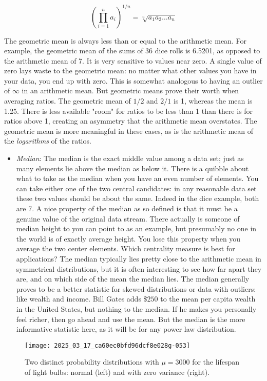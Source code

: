 \documentclass[10pt]{article}
\begin{document}
\[
\left(\prod_{i=1}^{n} a_{i}\right)^{1 / n}=\sqrt[n]{a_{1} a_{2} \ldots a_{n}}
\]

The geometric mean is always less than or equal to the arithmetic mean. For example, the geometric mean of the sums of 36 dice rolls is 6.5201, as opposed to the arithmetic mean of 7. It is very sensitive to values near zero. A single value of zero lays waste to the geometric mean: no matter what other values you have in your data, you end up with zero. This is somewhat analogous to having an outlier of \(\infty\) in an arithmetic mean.
But geometric means prove their worth when averaging ratios. The geometric mean of \(1 / 2\) and \(2 / 1\) is 1, whereas the mean is 1.25. There is less available "room" for ratios to be less than 1 than there is for ratios above 1, creating an asymmetry that the arithmetic mean overstates. The geometric mean is more meaningful in these cases, as is the arithmetic mean of the \textit{logarithms} of the ratios.

\begin{itemize}
  \item \textit{Median}: The median is the exact middle value among a data set; just as many elements lie above the median as below it. There is a quibble about what to take as the median when you have an even number of elements. You can take either one of the two central candidates: in any reasonable data set these two values should be about the same. Indeed in the dice example, both are 7.
A nice property of the median as so defined is that it must be a genuine value of the original data stream. There actually is someone of median height to you can point to as an example, but presumably no one in the world is of exactly average height. You lose this property when you average the two center elements.
Which centrality measure is best for applications? The median typically lies pretty close to the arithmetic mean in symmetrical distributions, but it is often interesting to see how far apart they are, and on which side of the mean the median lies.
The median generally proves to be a better statistic for skewed distributions or data with outliers: like wealth and income. Bill Gates adds $\$ 250$ to the mean per capita wealth in the United States, but nothing to the median. If he makes you personally feel richer, then go ahead and use the mean. But the median is the more informative statistic here, as it will be for any power law distribution.
\end{itemize}

\begin{figure}[h]
  \centering
  \texttt{[image: 2025\_03\_17\_ca60ec0bfd96dcf8e028g-053]}
  \caption{Two distinct probability distributions with \(\mu=3000\) for the lifespan of light bulbs: normal (left) and with zero variance (right).}
\end{figure}
\end{document}
